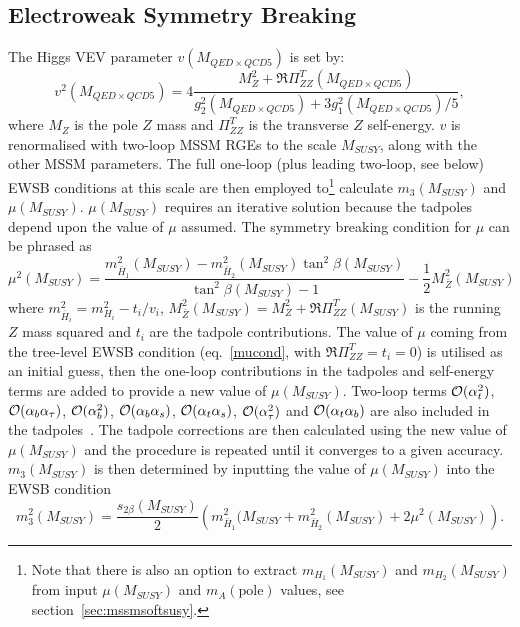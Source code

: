 \documentclass{article}
\def\at{\alpha_t}
\def\ab{\alpha_b}
\def\as{\alpha_s}
\def\atau{\alpha_{\tau}}
\def\oatab{{\cal O}(\at\ab)}
\def\oatas{{\cal O}(\at\as)}
\def\oabas{{\cal O}(\ab\as)}
\def\oatq{{\cal O}(\at^2)}
\def\oabq{{\cal O}(\ab^2)}
\def\oatauq{{\cal O}(\atau^2)}
\def\oabatau{{\cal O}(\ab \atau)}
\begin{document}
\subsection{Electroweak Symmetry Breaking}

The Higgs VEV parameter $v(M_{QED \times QCD5})$ is set by:
\begin{equation}
v^2(M_{QED \times QCD5}) = 4 \frac{M_Z^2 + \Re\Pi_{ZZ}^T(M_{QED \times QCD5})}{g_2^2(M_{QED \times QCD5}) + 3 g_1^2(M_{QED \times QCD5}) / 5},
\end{equation}
where
$M_Z$ is the pole $Z$ mass and
$\Pi_{ZZ}^T$ is the transverse $Z$ self-energy. $v$ is renormalised with
two-loop MSSM RGEs to the scale $M_{SUSY}$, along with the other MSSM
parameters.  
The full one-loop (plus leading two-loop, see below) EWSB
conditions at this scale are then employed to\footnote{Note that there is also
  an option to extract $m_{H_1}(M_{SUSY})$ and $m_{H_2}(M_{SUSY})$ from input
  $\mu(M_{SUSY})$ and  
$m_A(\mbox{pole})$ values, see section~\protect\ref{sec:mssmsoftsusy}.}
calculate $m_3(M_{SUSY})$ and $\mu(M_{SUSY})$. $\mu(M_{SUSY})$ requires an iterative solution
because the tadpoles depend upon the value of $\mu$ assumed.
The symmetry breaking condition for $\mu$ can be phrased
as~\cite{Pierce:1997zz}
\begin{equation}
\mu^2(M_{SUSY}) =
\frac{m_{\bar{H}_1}^2(M_{SUSY}) -  m_{\bar{H}_2}^2(M_{SUSY}) \tan^2
  \beta(M_{SUSY})}{\tan^2 \beta(M_{SUSY}) - 1} 
- \frac{1}{2} M_{\bar Z}^2(M_{SUSY})
\label{mucond} 
\end{equation}
where $m_{\bar{H}_i}^2 = m_{H_i}^2 - t_i/v_i$, $M_{\bar Z}^2(M_{SUSY}) = M_Z^2 +
\Re\Pi_{ZZ}^T(M_{SUSY})$ is the running $Z$ mass squared and
$t_i$ are the tadpole contributions.
The value of $\mu$ coming from the tree-level EWSB
condition (eq.~\ref{mucond}, with $\Re\Pi_{ZZ}^T=t_i=0$)
is utilised as an initial guess, then the one-loop contributions in the
tadpoles and self-energy terms are added to
provide a new value of $\mu(M_{SUSY})$. Two-loop terms 
$\oatq$, $\oabatau$, $\oabq$, $\oabas$, $\oatas$, $\oatauq$ and
$\oatab$
 are also included
in the 
tadpoles~\cite{Dedes:2002dy,Dedes:2003km}. 
The tadpole corrections are then calculated
using the new value of $\mu(M_{SUSY})$ and the procedure is repeated until it
converges to a given accuracy. $m_3(M_{SUSY})$ is then determined by inputting
the value 
of $\mu(M_{SUSY})$ into the EWSB condition
\begin{equation}
m_3^2(M_{SUSY})=\frac{s_{2\beta}(M_{SUSY})}{2} \left( m_{\bar{H}_1}^2(M_{SUSY} + m_{\bar{H}_2}^2(M_{SUSY}) + 2 \mu^2(M_{SUSY})
\right). \label{Bcond}
\end{equation}
\end{document}
